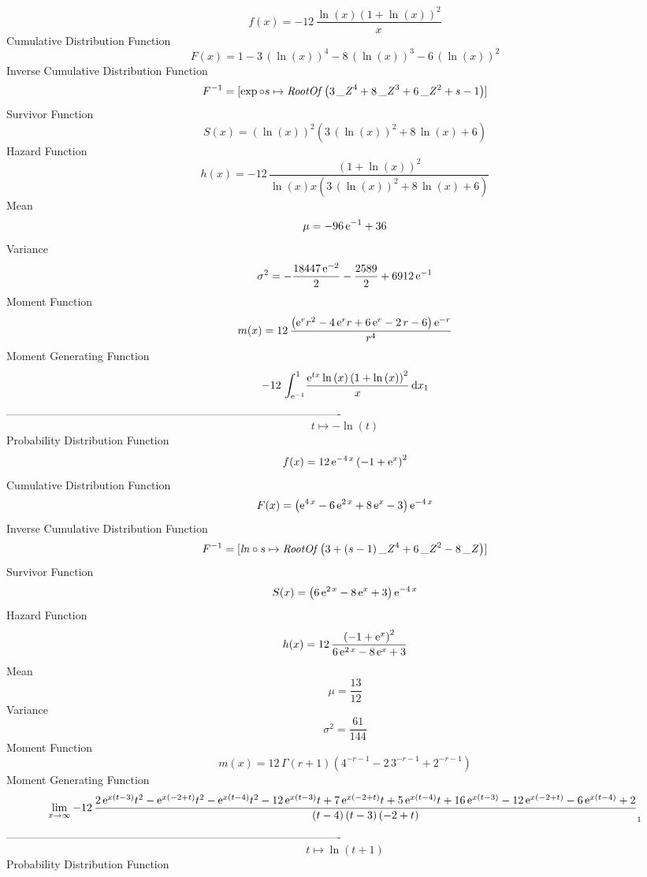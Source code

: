 \documentclass[12pt]{article}
\begin{document}
$$  f(x)=-12\,{\frac {\ln  \left( x \right)  \left( 1+\ln  \left( x \right) 
 \right) ^{2}}{x}}
$$Cumulative Distribution Function  
 $$F(x)=1-3\, \left( \ln  \left( x \right)  \right) ^{4}-8\, \left( \ln 
 \left( x \right)  \right) ^{3}-6\, \left( \ln  \left( x \right) 
 \right) ^{2}
$$ Inverse Cumulative Distribution Function 
  $$F^{-1} = [\exp\circ s\mapsto {\it RootOf} \left( 3\,{{\it \_Z}}^{4}+8\,{{\it 
\_Z}}^{3}+6\,{{\it \_Z}}^{2}+s-1 \right) ]
$$Survivor Function 
 $$ S(x)= \left( \ln  \left( x \right)  \right) ^{2} \left( 3\, \left( \ln 
 \left( x \right)  \right) ^{2}+8\,\ln  \left( x \right) +6 \right) 
$$ Hazard Function 
 $$ h(x)=-12\,{\frac { \left( 1+\ln  \left( x \right)  \right) ^{2}}{\ln 
 \left( x \right) x \left( 3\, \left( \ln  \left( x \right)  \right) ^
{2}+8\,\ln  \left( x \right) +6 \right) }}
$$Mean 
 $$ \mu=-96\,{{\rm e}^{-1}}+36
$$ Variance 
 $$ \sigma^2 = -{\frac {18447\,{{\rm e}^{-2}}}{2}}-{\frac{2589}{2}}+6912\,{{\rm e}^{-
1}}
$$Moment Function 
 $$ m(x) = 12\,{\frac { \left( {{\rm e}^{r}}{r}^{2}-4\,{{\rm e}^{r}}r+6\,{{\rm e}
^{r}}-2\,r-6 \right) {{\rm e}^{-r}}}{{r}^{4}}}
$$ Moment Generating Function 
 $$-12\,\int_{{{\rm e}^{-1}}}^{1}\!{\frac {{{\rm e}^{tx}}\ln  \left( x
 \right)  \left( 1+\ln  \left( x \right)  \right) ^{2}}{x}}\,{\rm d}x_
{{1}}
$$-------------------------------------------------------------------------------------------  \\$$t\mapsto -\ln  \left( t \right) 
$$Probability Distribution Function 
$$  f(x)=12\,{{\rm e}^{-4\,x}} \left( -1+{{\rm e}^{x}} \right) ^{2}
$$Cumulative Distribution Function  
 $$F(x)= \left( {{\rm e}^{4\,x}}-6\,{{\rm e}^{2\,x}}+8\,{{\rm e}^{x}}-3
 \right) {{\rm e}^{-4\,x}}
$$ Inverse Cumulative Distribution Function 
  $$F^{-1} = [{\it ln}\circ s\mapsto {\it RootOf} \left( 3+ \left( s-1 \right) {{
\it \_Z}}^{4}+6\,{{\it \_Z}}^{2}-8\,{\it \_Z} \right) ]
$$Survivor Function 
 $$ S(x)= \left( 6\,{{\rm e}^{2\,x}}-8\,{{\rm e}^{x}}+3 \right) {{\rm e}^{-4\,x
}}
$$ Hazard Function 
 $$ h(x)=12\,{\frac { \left( -1+{{\rm e}^{x}} \right) ^{2}}{6\,{{\rm e}^{2\,x}}
-8\,{{\rm e}^{x}}+3}}
$$Mean 
 $$ \mu={\frac{13}{12}}
$$ Variance 
 $$ \sigma^2 = {\frac{61}{144}}
$$Moment Function 
 $$ m(x) = 12\,\Gamma \left( r+1 \right)  \left( {4}^{-r-1}-2\,{3}^{-r-1}+{2}^{-r
-1} \right) 
$$ Moment Generating Function 
 $$\lim _{x\rightarrow \infty }-12\,{\frac {2\,{{\rm e}^{x \left( t-3
 \right) }}{t}^{2}-{{\rm e}^{x \left( -2+t \right) }}{t}^{2}-{{\rm e}^
{x \left( t-4 \right) }}{t}^{2}-12\,{{\rm e}^{x \left( t-3 \right) }}t
+7\,{{\rm e}^{x \left( -2+t \right) }}t+5\,{{\rm e}^{x \left( t-4
 \right) }}t+16\,{{\rm e}^{x \left( t-3 \right) }}-12\,{{\rm e}^{x
 \left( -2+t \right) }}-6\,{{\rm e}^{x \left( t-4 \right) }}+2}{
 \left( t-4 \right)  \left( t-3 \right)  \left( -2+t \right) }}_{{1}}
$$-------------------------------------------------------------------------------------------  \\$$t\mapsto \ln  \left( t+1 \right) 
$$Probability Distribution Function 
\end{document}
